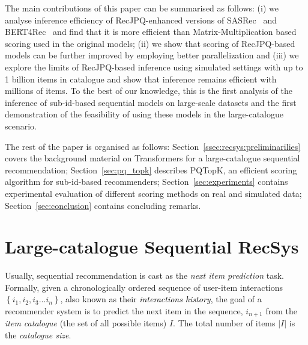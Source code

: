 \documentclass[sigconf,natbib=true, review=true]{acmart} %
\newcommand{\pageenlarge}[1]{\marginnote{#1}\enlargethispage{#1\baselineskip}}
\newcommand{\nt}[1]{\textcolor{black}{#1}}
\begin{document}
 The main contributions of this paper can be summarised as follows: (i) we analyse inference efficiency of RecJPQ-enhanced versions of SASRec~\cite{SASRec} and BERT4Rec~\cite{BERT4Rec} and find that it is more efficient than Matrix-Multiplication based scoring used in the original models; (ii) we show that scoring of RecJPQ-based models can be further improved by employing better parallelization and (iii) we explore the limits of RecJPQ-based inference using simulated settings with up to 1 billion items in catalogue and show that inference remains efficient with millions of items.
To the best of our knowledge, this is the first analysis of the inference of sub-id-based sequential models on large-scale datasets and the first demonstration of the feasibility of using these models in the large-catalogue scenario. 

The rest of the paper is organised as follows: Section~\ref{ssec:recsys:preliminarilies} covers the background material on Transformers for a large-catalogue sequential recommendation; Section~\ref{sec:pq_topk} describes PQTopK, an efficient scoring algorithm for sub-id-based recommenders; Section~\ref{sec:experiments} contains experimental evaluation of different scoring methods on real and simulated data; Section~\ref{sec:conclusion} contains concluding remarks. 


\section{Large-catalogue Sequential RecSys}\label{sec:rec}\label{ssec:recsys:preliminarilies}

\pageenlarge{3}
 Usually, sequential recommendation is cast as the \emph{next item prediction} task. Formally, given a chronologically ordered sequence of user-item interactions $\left\{i_1, i_2, i_3 ... i_n\right\}$, \nt{also known as their \textit{interactions history},} the goal of a recommender system is to predict the next item in the sequence, $i_{n+1}$ from the \emph{item catalogue} (the set of all possible items) $I$. The total number of items $|I|$ is the \emph{catalogue size}.
\end{document}

